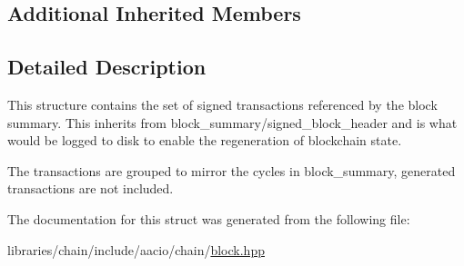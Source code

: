 \subsection*{Additional Inherited Members}


\subsection{Detailed Description}
This structure contains the set of signed transactions referenced by the block summary. This inherits from block\+\_\+summary/signed\+\_\+block\+\_\+header and is what would be logged to disk to enable the regeneration of blockchain state.

The transactions are grouped to mirror the cycles in block\+\_\+summary, generated transactions are not included. 

The documentation for this struct was generated from the following file\+:\begin{DoxyCompactItemize}
\item 
libraries/chain/include/aacio/chain/\mbox{\hyperlink{block_8hpp}{block.\+hpp}}\end{DoxyCompactItemize}
